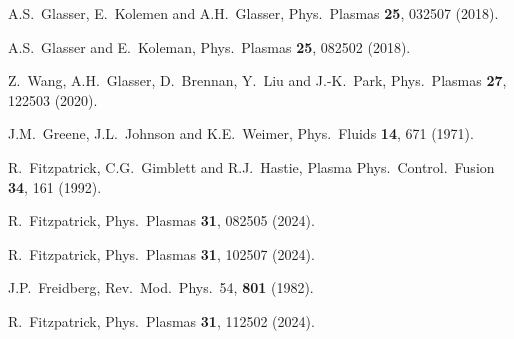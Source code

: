 \documentclass[12pt,prb,aps]{revtex4-1}
\begin{document}
\begin{thebibliography}{99}
 A.S.~Glasser, E.~Kolemen and A.H.~Glasser, Phys.\ Plasmas {\bf 25}, 032507 (2018).

 A.S.~Glasser and E.~Koleman, Phys.\ Plasmas {\bf 25}, 082502 (2018). 

 Z.~Wang, A.H.~Glasser, D.~Brennan, Y.~Liu and J.-K.~Park, Phys.\ Plasmas {\bf 27}, 122503 (2020).

 J.M.~Greene, J.L.~Johnson and K.E.~Weimer,  Phys.\  Fluids  {\bf 14}, 671 (1971).

 R.~Fitzpatrick, C.G.~Gimblett and R.J.~Hastie, Plasma Phys.\ Control.\ Fusion {\bf 34}, 161 (1992). 

 R.~Fitzpatrick, Phys.\ Plasmas {\bf 31}, 082505 (2024).

 R.~Fitzpatrick, Phys.\ Plasmas {\bf 31}, 102507 (2024).

 J.P.~Freidberg, Rev.\ Mod.\ Phys.\ 54, {\bf 801} (1982).

 R.~Fitzpatrick, Phys.\ Plasmas {\bf 31}, 112502 (2024).








\end{thebibliography}
\end{document}
